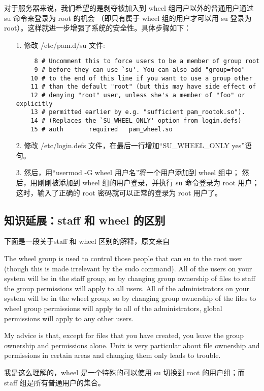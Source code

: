 \documentclass[a4paper,left=1.5cm,right=1.5cm,11pt]{article}
\begin{document}
	对于服务器来说，我们希望的是剥夺被加入到 wheel 组用户以外的普通用户通过 su 命令来登录为 root 的机会
	（即只有属于 wheel 组的用户才可以用 su 登录为 root）。这样就进一步增强了系统的安全性。具体步骤如下：
	\begin{itemize}
		\item[1.] 修改 /etc/pam.d/su 文件:
		\begin{lstlisting}
	 8 # Uncomment this to force users to be a member of group root
	 9 # before they can use `su'. You can also add "group=foo"
	10 # to the end of this line if you want to use a group other
	11 # than the default "root" (but this may have side effect of
	12 # denying "root" user, unless she's a member of "foo" or explicitly
	13 # permitted earlier by e.g. "sufficient pam_rootok.so").
	14 # (Replaces the `SU_WHEEL_ONLY' option from login.defs)
	15 # auth       required   pam_wheel.so
		\end{lstlisting}

		\item[2.] 修改 /etc/login.defs 文件，在最后一行增加“SU\_WHEEL\_ONLY yes”语句。

		\item[3.] 然后，用“usermod -G wheel 用户名”将一个用户添加到 wheel 组中；
				  然后，用刚刚被添加到 wheel 组的用户登录，并执行 su 命令登录为 root 用户；这时，输入了正确的 root 密码就可以正常的登录为 root 用户了。
	\end{itemize}

\subsection{知识延展：staff 和 wheel 的区别}

	下面是一段关于staff 和 wheel 区别的解释，原文来自
	
	The wheel group is used to control those people that can su to the root user (though this is made irrelevant by the sudo command).
	All of the users on your system will be in the staff group, 
	so by changing group ownership of files to staff the group permissions will apply to all users. 
	All of the administrators on your system will be in the wheel group, 
	so by changing group ownership of the files to wheel group permissions will apply to all of the administrators, 
	global permissions will apply to any other users.\par

	My advice is that, except for files that you have created, 
	you leave the group ownership and permissions alone. 
	Unix is very particular about file ownership and permissions in certain areas and changing them only leads to trouble.\par

	我是这么理解的，wheel 是一个特殊的可以使用 su 切换到 root 的用户组；而 staff 组是所有普通用户的集合。
	
\end{document}
